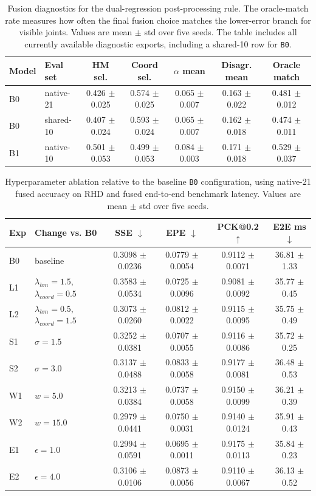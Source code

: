 \documentclass[10pt,letterpaper,twocolumn]{article}
\begin{document}
\begin{table}[H]
\centering
\footnotesize
\caption{Fusion diagnostics for the dual-regression post-processing rule. The oracle-match rate measures how often the final fusion choice matches the lower-error branch for visible joints. Values are mean $\pm$ std over five seeds. The table includes all currently available diagnostic exports, including a shared-10 row for \texttt{B0}.}
\label{tab:fusion_diagnostics}
\begin{tabular}{llccccc}
\toprule
Model & Eval set & HM sel. & Coord sel. & $\alpha$ mean & Disagr. mean & Oracle match \\
\midrule
B0 & native-21 & 0.426 $\pm$ 0.025 & 0.574 $\pm$ 0.025 & 0.065 $\pm$ 0.007 & 0.163 $\pm$ 0.022 & 0.481 $\pm$ 0.012 \\
B0 & shared-10 & 0.407 $\pm$ 0.024 & 0.593 $\pm$ 0.024 & 0.065 $\pm$ 0.007 & 0.162 $\pm$ 0.018 & 0.474 $\pm$ 0.011 \\
B1 & native-10 & 0.501 $\pm$ 0.053 & 0.499 $\pm$ 0.053 & 0.084 $\pm$ 0.003 & 0.171 $\pm$ 0.018 & 0.529 $\pm$ 0.037 \\
\bottomrule
\end{tabular}
\end{table}

\begin{table}[H]
\centering
\footnotesize
\caption{Hyperparameter ablation relative to the baseline \texttt{B0} configuration, using native-21 fused accuracy on RHD and fused end-to-end benchmark latency. Values are mean $\pm$ std over five seeds.}
\label{tab:hyper_ablation}
\begin{tabular}{llcccc}
\toprule
Exp & Change vs. B0 & SSE $\downarrow$ & EPE $\downarrow$ & PCK@0.2 $\uparrow$ & E2E ms $\downarrow$ \\
\midrule
B0 & baseline & 0.3098 $\pm$ 0.0236 & 0.0779 $\pm$ 0.0054 & 0.9112 $\pm$ 0.0071 & 36.81 $\pm$ 1.33 \\
L1 & $\lambda_{hm}=1.5$, $\lambda_{coord}=0.5$ & 0.3583 $\pm$ 0.0534 & 0.0725 $\pm$ 0.0096 & 0.9081 $\pm$ 0.0092 & 35.77 $\pm$ 0.45 \\
L2 & $\lambda_{hm}=0.5$, $\lambda_{coord}=1.5$ & 0.3073 $\pm$ 0.0260 & 0.0812 $\pm$ 0.0022 & 0.9115 $\pm$ 0.0095 & 35.75 $\pm$ 0.49 \\
S1 & $\sigma=1.5$ & 0.3252 $\pm$ 0.0381 & 0.0707 $\pm$ 0.0055 & 0.9116 $\pm$ 0.0086 & 35.72 $\pm$ 0.25 \\
S2 & $\sigma=3.0$ & 0.3137 $\pm$ 0.0488 & 0.0833 $\pm$ 0.0058 & 0.9177 $\pm$ 0.0081 & 36.48 $\pm$ 0.53 \\
W1 & $w=5.0$ & 0.3213 $\pm$ 0.0384 & 0.0737 $\pm$ 0.0058 & 0.9150 $\pm$ 0.0099 & 36.21 $\pm$ 0.39 \\
W2 & $w=15.0$ & 0.2979 $\pm$ 0.0441 & 0.0750 $\pm$ 0.0031 & 0.9140 $\pm$ 0.0124 & 35.91 $\pm$ 0.43 \\
E1 & $\epsilon=1.0$ & 0.2994 $\pm$ 0.0591 & 0.0695 $\pm$ 0.0011 & 0.9175 $\pm$ 0.0113 & 35.84 $\pm$ 0.23 \\
E2 & $\epsilon=4.0$ & 0.3106 $\pm$ 0.0106 & 0.0873 $\pm$ 0.0056 & 0.9110 $\pm$ 0.0067 & 36.13 $\pm$ 0.52 \\
\bottomrule
\end{tabular}
\end{table}
\end{document}
